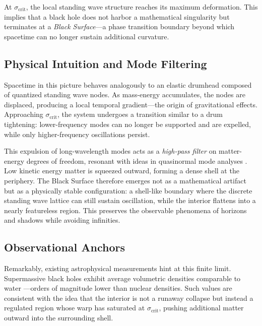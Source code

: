 \documentclass[12pt]{article}
\begin{document}
At $\sigma_{\text{crit}}$, the local standing wave structure reaches its maximum deformation. This implies that a black hole does not harbor a mathematical singularity but terminates at a \emph{Black Surface}---a phase transition boundary beyond which spacetime can no longer sustain additional curvature.

\subsection{Physical Intuition and Mode Filtering}

Spacetime in this picture behaves analogously to an elastic drumhead composed of quantized standing wave nodes. As mass-energy accumulates, the nodes are displaced, producing a local temporal gradient---the origin of gravitational effects. Approaching $\sigma_{\text{crit}}$, the system undergoes a transition similar to a drum tightening: lower-frequency modes can no longer be supported and are expelled, while only higher-frequency oscillations persist.

This expulsion of long-wavelength modes acts as a \emph{high-pass filter} on matter-energy degrees of freedom, resonant with ideas in quasinormal mode analyses \cite{kokkotas1999}. Low kinetic energy matter is squeezed outward, forming a dense shell at the periphery. The Black Surface therefore emerges not as a mathematical artifact but as a physically stable configuration: a shell-like boundary where the discrete standing wave lattice can still sustain oscillation, while the interior flattens into a nearly featureless region.  This preserves the observable phenomena of horizons and shadows while avoiding infinities.

\subsection{Observational Anchors}

Remarkably, existing astrophysical measurements hint at this finite limit. Supermassive black holes exhibit average volumetric densities comparable to water \cite{king2006, ozel2010}---orders of magnitude lower than nuclear densities. Such values are consistent with the idea that the interior is not a runaway collapse but instead a regulated region whose warp has saturated at $\sigma_{\text{crit}}$, pushing additional matter outward into the surrounding shell.
\end{document}
